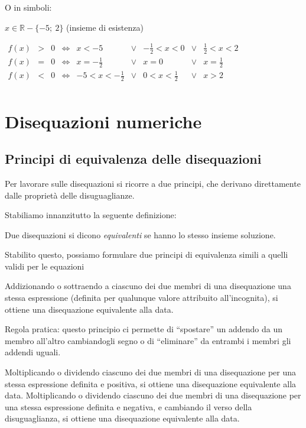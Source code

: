 O in simboli:

$x \in \mathbb{R} - \{ -5;~2 \}$ (insieme di esistenza)

$\begin{array}{cccccccccc}
f(x) & > & 0 & \Leftrightarrow &
 x < -5 & \lor & -\frac{1}{2} < x < 0 & \lor & \frac{1}{2} < x < 2 \\
 
f(x) & = & 0 & \Leftrightarrow &
 x = -\frac{1}{2} & \lor & x = 0 & \lor & x = \frac{1}{2} \\
 
f(x) & < & 0 & \Leftrightarrow &
 -5 < x < -\frac{1}{2} & \lor & 0 < x < \frac{1}{2} & \lor & x > 2 \\
\end{array}$

\section{Disequazioni numeriche}
\label{sec:dis_numeriche}

\subsection{Principi di equivalenza delle disequazioni}

Per lavorare sulle disequazioni si ricorre a due principi, che derivano 
direttamente dalle proprietà delle disuguaglianze.

Stabiliamo innanzitutto la seguente definizione:

\begin{definizione}
Due disequazioni si dicono \emph{equivalenti} se hanno lo
stesso insieme soluzione.
\end{definizione}

Stabilito questo, possiamo formulare due principi di equivalenza
simili a quelli validi per le equazioni

\begin{principio}[I principio]
\label{ppd}
Addizionando o sottraendo a ciascuno dei due membri di
una disequazione una stessa espressione (definita per qualunque
valore attribuito all'incognita), si ottiene una
disequazione equivalente alla data.
\end{principio}

Regola pratica: questo principio ci permette di
``spostare'' un addendo da un membro
all'altro cambiandogli segno o di
``eliminare'' da entrambi i membri
gli addendi uguali.

\begin{principio}[II principio]
Moltiplicando o dividendo ciascuno dei due membri di
una disequazione per una stessa espressione definita e positiva, 
si ottiene una disequazione equivalente alla data.
Moltiplicando o dividendo ciascuno dei due membri di
una disequazione per una stessa espressione definita e negativa, 
e cambiando il verso della disuguaglianza,
si ottiene una disequazione equivalente alla data.
\end{principio}

